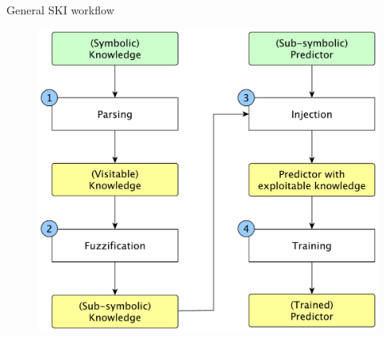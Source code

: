 \documentclass[presentation]{beamer}\mode<presentation>{\usetheme{AMSBolognaFC}}
\begin{document}
\section{\longpsyki}

\begin{frame}{General SKI workflow}
    
    \begin{figure}
        \centering
        \includegraphics[width=0.8\textheight]{figures/ski-workflow.pdf}
    \end{figure}
    
\end{frame}
\end{document}
